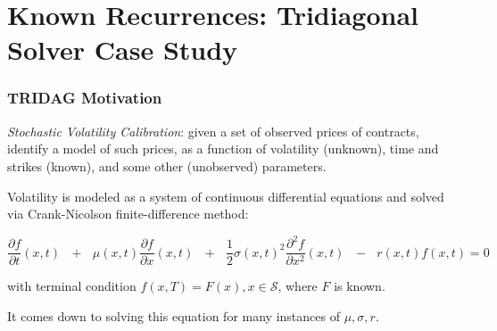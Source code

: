 \documentclass{beamer}
\newcommand{\emp}[1]{\textcolor{DikuRed}{ #1}}
\begin{document}
\section{Known Recurrences: Tridiagonal Solver Case Study}
\begin{frame}[fragile]
	\tableofcontents[currentsection]
\end{frame}

\begin{frame}[fragile,t]
  \frametitle{TRIDAG Motivation}

\emp{\em Stochastic Volatility Calibration}: given a set of observed prices
of contracts, identify a model of such prices, as a function of volatility
(unknown), time and strikes (known), and some other (unobserved) parameters.
\bigskip 

Volatility is modeled as a system of continuous differential
equations and solved via Crank-Nicolson finite-difference method:

\begin{equation}
\frac{\partial f}{\partial t}(x,t)\mbox{ }+\mbox{ }\mu(x,t)\frac{\partial f}{\partial x}(x,t)\mbox{ }+\mbox{ }
\frac{1}{2}\sigma(x,t)^{2}\frac{\partial^{2} f}{\partial x^{2}}(x,t)\mbox{ }-\mbox{ }
r(x,t)f(x,t) = 0
\end{equation}

\smallskip

with terminal condition $f(x, T) = F(x), x \in \mathcal{S}$, where $F$ is known.

\bigskip

\emp{It comes down to solving this equation for many instances of $\mu, \sigma, r$.}

\end{frame}
\end{document}
